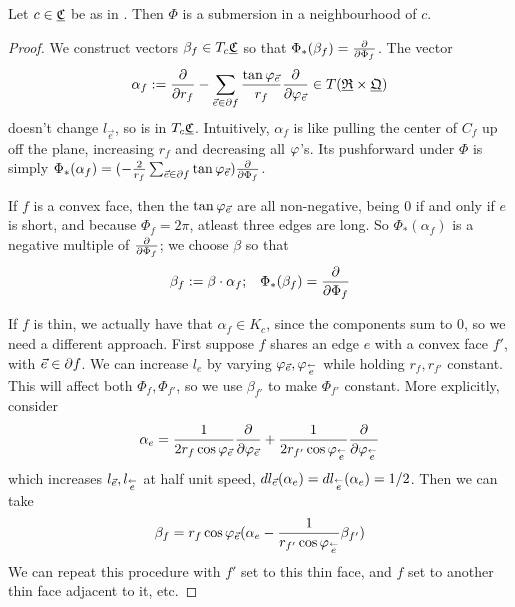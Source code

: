 \begin{lemma}
\label{l:Phi_full}
Let $c \in {\underline{\mathfrak{C}}}$ be as in .
Then $\Phi$ is a submersion in a neighbourhood of $c$.
\end{lemma}

\begin{proof}
We construct vectors $\beta_f \in T_c {\underline{\mathfrak{C}}}$ so that
$\Phi_*(\beta_f) = {\frac{\partial}{\partial \Phi_f}}$.
The vector
\begin{equation}
\label{e:alpha_f}
\alpha_f := {\frac{\partial}{\partial r_f}} - \sum_{\vec{e} \in \partial f} 
	\frac{\tan \varphi_{\vec{e}}}{r_f} {\frac{\partial}{\partial \varphi_{\vec{e}}}}
	\in T({\underline{\mathfrak{R}}} \times {\underline{\mathfrak{Q}}})
\end{equation}
doesn't change $l_{\vec{e}}$,
so is in $T_c {\underline{\mathfrak{C}}}$.
Intuitively, $\alpha_f$ is like
pulling the center of $C_f$ up off the plane, increasing $r_f$ and decreasing all
$\varphi$'s.
Its pushforward under $\Phi$ is simply
$\Phi_*(\alpha_f) =
	(-\frac{2}{r_f} \sum_{\vec{e}\in \partial f} \tan \varphi_{\vec{e}})
	{\frac{\partial}{\partial \Phi_f}}$.


If $f$ is a convex face, then the $\tan \varphi_{\vec{e}}$ are all non-negative,
being 0 if and only if $e$ is short,
and because $\Phi_f = 2\pi$, atleast three edges are long.
So $\Phi_*(\alpha_f)$ is a negative multiple of ${\frac{\partial}{\partial \Phi_f}}$;
we choose $\beta$ so that
\begin{equation}
\label{e:beta_f_convex}
\beta_f := \beta \cdot \alpha_f; \;\;\;
\Phi_*(\beta_f) = {\frac{\partial}{\partial \Phi_f}}
\end{equation}


If $f$ is thin, we actually have that $\alpha_f \in K_c$,
since the components sum to 0, so we need a different approach.
First suppose $f$ shares an edge $e$ with a convex face $f'$,
with $\vec{e} \in \partial f$.
We can increase $l_e$
by varying $\varphi_{\vec{e}},\varphi_{\overset{\leftarrow}{e}}$
while holding $r_f,r_{f'}$ constant.
This will affect both $\Phi_f, \Phi_{f'}$,
so we use $\beta_{f'}$ to make $\Phi_{f'}$ constant.
More explicitly, consider
\begin{equation}
\label{e:alpha_e}
\alpha_e = \frac{1}{2 r_f \cos \varphi_{\vec{e}}} {\frac{\partial}{\partial \varphi_{\vec{e}}}}
+ \frac{1}{2 r_{f'}\cos \varphi_{\overset{\leftarrow}{e}}} {\frac{\partial}{\partial \varphi_{\overset{\leftarrow}{e}}}}
\end{equation}
which increases $l_{\vec{e}}, l_{\overset{\leftarrow}{e}}$ at half unit speed,
$dl_{\vec{e}}(\alpha_e) = dl_{\overset{\leftarrow}{e}}(\alpha_e) = 1/2$.
Then we can take
\begin{equation}
\label{e:beta_f_thin}
\beta_f = r_f \cos \varphi_{\vec{e}}
	(\alpha_e - \frac{1}{r_{f'} \cos \varphi_{\overset{\leftarrow}{e}}} \beta_{f'})
\end{equation}
We can repeat this procedure with $f'$ set to this thin face,
and $f$ set to another thin face adjacent to it, etc.
\end{proof}

